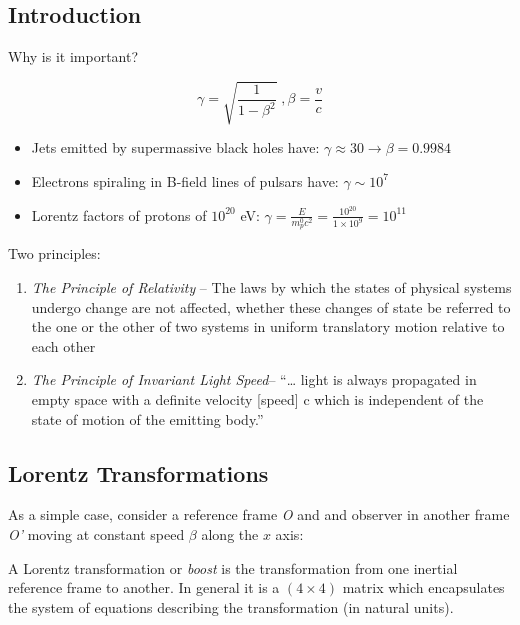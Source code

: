 \documentclass[
  letterpaper,
  DIV=11,
  numbers=noendperiod]{scrreprt}
\providecommand{\tightlist}{%
  \setlength{\itemsep}{0pt}\setlength{\parskip}{0pt}}\usepackage{longtable,booktabs,array}
\begin{document}
\subsection{Introduction}\label{introduction}

Why is it important?

\[\gamma = \sqrt{\frac{1}{1-\beta^2}}\;, \beta = \frac{v}{c}\]

\begin{itemize}
\tightlist
\item
  Jets emitted by supermassive black holes have:
  \(\gamma \approx 30 \rightarrow \beta = 0.9984\)
\item
  Electrons spiraling in B-field lines of pulsars have:
  \(\gamma \sim 10^7\)
\item
  Lorentz factors of protons of \(10^{20}\) eV:
  \(\gamma = \frac{E}{m^0_p c^2} = \frac{10^{20}}{1\times 10^9} = 10^{11}\)
\end{itemize}

Two principles:

\begin{enumerate}
\def\labelenumi{\arabic{enumi}.}
\item
  \emph{The Principle of Relativity} -- The laws by which the states of
  physical systems undergo change are not affected, whether these
  changes of state be referred to the one or the other of two systems in
  uniform translatory motion relative to each other
\item
  \emph{The Principle of Invariant Light Speed}-- ``\ldots{} light is
  always propagated in empty space with a definite velocity {[}speed{]}
  c which is independent of the state of motion of the emitting body.''
\end{enumerate}

\subsection{Lorentz Transformations}\label{lorentz-transformations}

As a simple case, consider a reference frame \emph{O} and and observer
in another frame \emph{O'} moving at constant speed \(\beta\) along the
\(x\) axis:

\begin{center}

\end{center}

A Lorentz transformation or \emph{boost} is the transformation from one
inertial reference frame to another. In general it is a \((4\times4)\)
matrix which encapsulates the system of equations describing the
transformation (in natural units).
\end{document}
